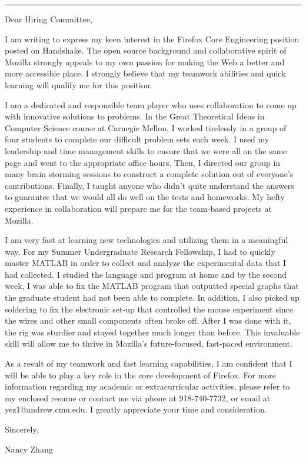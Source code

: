 \documentclass{kindofneat}
\begin{document}


\noindent\rule{\textwidth}{1pt}

\Large

\noindent Dear Hiring Committee,

\vspace*{1em}

I am writing to express my keen interest in the Firefox Core Engineering position posted on Handshake. The open source background and collaborative spirit of Mozilla strongly appeals to my own passion for making the Web a better and more accessible place. I strongly believe that my teamwork abilities and quick learning will qualify me for this position.

\vspace*{0.5em}

I am a dedicated and responsible team player who uses collaboration to come up with innovative solutions to problems. In the Great Theoretical Ideas in Computer Science course at Carnegie Mellon, I worked tirelessly in a group of four students to complete our difficult problem sets each week. I used my leadership and time management skills to ensure that we were all on the same page and went to the appropriate office hours. Then, I directed our group in many brain storming sessions to construct a complete solution out of everyone's contributions. Finally, I taught anyone who didn't quite understand the answers to guarantee that we would all do well on the tests and homeworks. My hefty experience in collaboration will prepare me for the team-based projects at Mozilla. 

\vspace*{0.5em}
I am very fast at learning new technologies and utilizing them in a meaningful way. For my Summer Undergraduate Research Fellowship, I had to quickly master MATLAB in order to collect and analyze the experimental data that I had collected. I studied the language and program at home and by the second week, I was able to fix the MATLAB program that outputted special graphs that the graduate student had not been able to complete. In addition, I also picked up soldering to fix the electronic set-up that controlled the mouse experiment since the wires and other small components often broke off. After I was done with it, the rig was sturdier and stayed together much longer than before. This invaluable skill will allow me to thrive in Mozilla's future-focused, fast-paced environment. 
\vspace*{0.5em}

As a result of my teamwork and fast learning capabilities, I am confident that I will be able to play a key role in the core development of Firefox. For more information regarding my academic or extracurricular activities, please refer to my enclosed resume or contact me via phone at 918-740-7732, or email at yez1@andrew.cmu.edu. I greatly appreciate your time and consideration.

\vspace*{1em}
\noindent Sincerely,

\vspace*{2em}
\noindent Nancy Zhang
\end{document}
